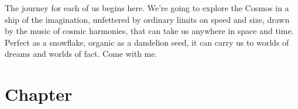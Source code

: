 \documentclass[letterpaper,9pt]{book}
\begin{document}
The journey for each of us begins here. We're going to explore the Cosmos in a ship of the imagination, unfettered by ordinary limits on speed and size, drawn by the music of cosmic harmonies, that can take us anywhere in space and time. Perfect as a snowflake, organic as a dandelion seed, it can carry us to worlds of dreams and worlds of fact. Come with me.

\chapter{Chapter}
\lipsum[1-20]
\end{document}
